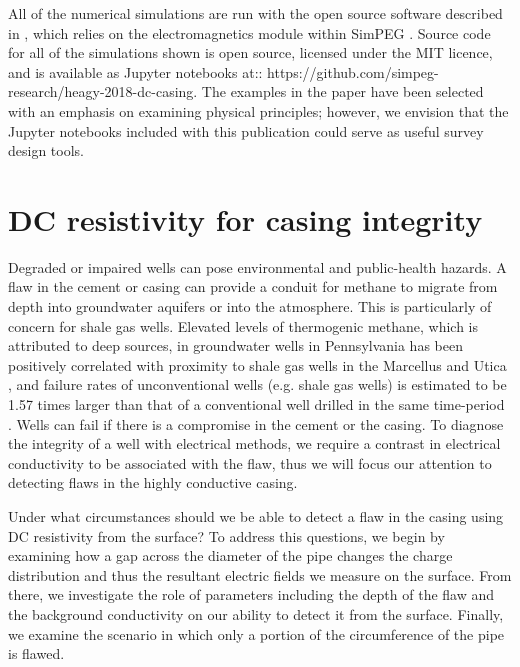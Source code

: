 All of the numerical simulations are run with the open source software described in \citep{Heagy2018}, which relies on the electromagnetics module within SimPEG \citep{Cockett2015, Heagy2017}. Source code for all of the simulations shown is open source, licensed under the MIT licence, and is available as Jupyter notebooks at:: https://github.com/simpeg-research/heagy-2018-dc-casing. The examples in the paper have been selected with an emphasis on examining physical principles; however, we envision that the Jupyter notebooks included with this publication could serve as useful survey design tools.

\section{DC resistivity for casing integrity}
\label{sec:casing_integrity}

Degraded or impaired wells can pose environmental and public-health hazards. A flaw in the cement or casing can provide a conduit for methane to migrate from depth into groundwater aquifers or into the atmosphere. This is particularly of concern for shale gas wells. Elevated levels of thermogenic methane, which is attributed to deep sources, in groundwater wells in Pennsylvania has been positively correlated with proximity to shale gas wells in the Marcellus and Utica \citep{Osborn2011, Jackson2013}, and failure rates of unconventional wells (e.g. shale gas wells) is estimated to be 1.57 times larger than that of a conventional well drilled in the same time-period \citep{Ingraffea2014}. Wells can fail if there is a compromise in the cement or the casing. To diagnose the integrity of a well with electrical methods, we require a contrast in electrical conductivity to be associated with the flaw, thus we will focus our attention to detecting flaws in the highly conductive casing.

Under what circumstances should we be able to detect a flaw in the casing using DC resistivity from the surface? To address this questions, we begin by examining how a gap across the diameter of the pipe changes the charge distribution and thus the resultant electric fields we measure on the surface. From there, we investigate the role of parameters including the depth of the flaw and the background conductivity on our ability to detect it from the surface. Finally, we examine the scenario in which only a portion of the circumference of the pipe is flawed.

